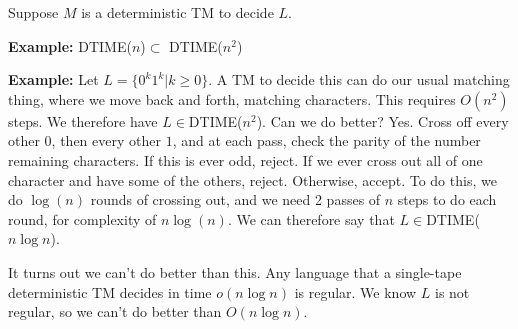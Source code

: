 \documentclass[twoside]{article}
\begin{document}
Suppose $M$ is a deterministic TM to decide $L$.



\textbf{Example:} DTIME($n$)$\subset $ DTIME($n^2$)

\textbf{Example:} Let $L = \{ 0^k1^k | k\geq 0 \}$.  A TM to decide this can do our usual matching thing, where we move back and forth, matching characters.  This requires $O(n^2)$ steps.  We therefore have $L\in$DTIME($n^2$).  Can we do better?  Yes. Cross off every other $0$, then every other $1$, and at each pass, check the parity of the number remaining characters.  If this is ever odd, reject.  If we ever cross out all of one character and have some of the others, reject.  Otherwise, accept.  To do this, we do $\log(n)$ rounds of crossing out, and we need 2 passes of $n$ steps to do each round, for complexity of $n\log(n)$.  We can therefore say that $L\in$DTIME($n\log n$).

It turns out we can't do better than this.  Any language that a single-tape deterministic TM decides in time $o(n\log n)$ is regular.  We know $L$ is not regular, so we can't do better than $O(n\log n)$. 
\end{document}
